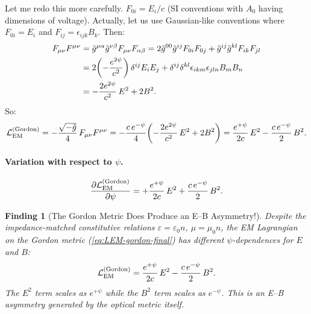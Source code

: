 \documentclass[11pt,a4paper]{article}
\newtheorem{finding}{Finding}
\theoremstyle{definition}
\theoremstyle{remark}
\begin{document}
Let me redo this more carefully.  $F_{0i} = E_i/c$ (SI conventions
with $A_0$ having dimensions of voltage).  Actually, let us use
Gaussian-like conventions where $F_{0i} = E_i$ and
$F_{ij} = \epsilon_{ijk}B_k$.  Then:
\begin{align}
F_{\mu\nu}F^{\mu\nu}
&= \tilde{g}^{\mu\alpha}\tilde{g}^{\nu\beta}F_{\mu\nu}F_{\alpha\beta}
= 2\tilde{g}^{00}\tilde{g}^{ij}F_{0i}F_{0j}
  + \tilde{g}^{ij}\tilde{g}^{kl}F_{ik}F_{jl} \notag\\
&= 2\!\left(-\frac{e^{2\psi}}{c^2}\right)\delta^{ij}E_i E_j
  + \delta^{ij}\delta^{kl}\epsilon_{ikm}\epsilon_{jln}B_m B_n \notag\\
&= -\frac{2e^{2\psi}}{c^2}\,E^2 + 2B^2.
\end{align}
So:
\begin{equation}\label{eq:LEM-gordon-final}
\mathcal{L}_{\rm EM}^{\rm (Gordon)}
= -\frac{\sqrt{-\tilde{g}}}{4}\,F_{\mu\nu}F^{\mu\nu}
= -\frac{c\,e^{-\psi}}{4}\!\left(-\frac{2e^{2\psi}}{c^2}\,E^2 + 2B^2\right)
= \frac{e^{+\psi}}{2c}\,E^2 - \frac{c\,e^{-\psi}}{2}\,B^2.
\end{equation}

\paragraph{Variation with respect to $\psi$.}
\begin{equation}\label{eq:dLdpsi-gordon}
\frac{\partial\mathcal{L}_{\rm EM}^{\rm (Gordon)}}{\partial\psi}
= +\frac{e^{+\psi}}{2c}\,E^2 + \frac{c\,e^{-\psi}}{2}\,B^2.
\end{equation}

\begin{finding}[The Gordon Metric Does Produce an E--B Asymmetry!]\label{find:gordon-asym}
Despite the impedance-matched constitutive relations
$\varepsilon = \varepsilon_0 n$, $\mu = \mu_0 n$, the EM Lagrangian
on the Gordon metric (\ref{eq:LEM-gordon-final}) has different
$\psi$-dependences for $E$ and $B$:
\begin{equation}
\mathcal{L}_{\rm EM}^{\rm (Gordon)}
= \frac{e^{+\psi}}{2c}\,E^2 - \frac{c\,e^{-\psi}}{2}\,B^2.
\end{equation}
The $E^2$ term scales as $e^{+\psi}$ while the $B^2$ term scales as
$e^{-\psi}$.  This is an E--B asymmetry generated by the optical metric
itself.
\end{finding}
\end{document}
